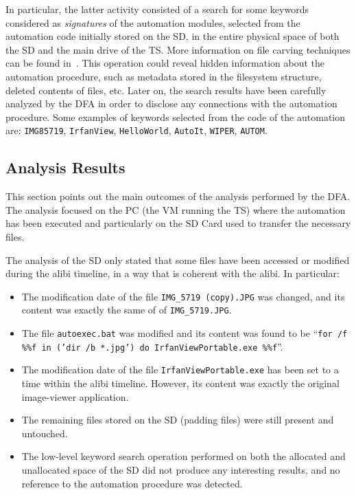 \documentclass[10pt, conference]{IEEEtran}
\begin{document}
In particular, the latter activity consisted of a search for some keywords considered as {\sl signatures} of the automation modules, selected from the automation code initially stored on the SD, in the entire physical space of both the SD and the main drive of the TS. 
More information on file carving techniques can be found in~\cite{jowua11-2-3-03}.
This operation could reveal hidden information about the automation procedure, such as metadata stored in the filesystem structure, deleted contents of files, etc. Later on, the search results have been carefully analyzed by the DFA in order to disclose any connections with the automation procedure. 
Some examples of keywords selected from the code of the automation are: \verb=IMG85719=, \verb=IrfanView=, \verb=HelloWorld=, \verb=AutoIt=, \verb=WIPER=, \verb=AUTOM=.


\subsection{Analysis Results}

This section points out the main outcomes of the analysis performed by the DFA. The analysis focused on the PC (the VM running the TS)  where the automation has been executed and particularly on the SD Card used to transfer the necessary files. 

 The analysis of the SD only stated that some files have been accessed or modified during the alibi timeline, in a way that is coherent with the alibi. In particular:

\begin{itemize}
 \item The modification date of the file \verb=IMG_5719 (copy).JPG= was changed, and its content was exactly the same of of \verb=IMG_5719.JPG=. 
 \item The file \verb=autoexec.bat= was modified and its content was found to be ``{\tt for /f \%\%f in ('dir /b *.jpg') do IrfanViewPortable.exe \%\%f}''. 
 \item The modification date of the file \verb=IrfanViewPortable.exe= has been set to a time within the alibi timeline. However, its content was exactly the original image-viewer application.
 \item The remaining files stored on the SD (padding files) were still present and untouched.
 \item The low-level keyword search operation performed on both the allocated and unallocated space of the SD did not produce any interesting results, and no reference to the automation procedure was detected.
\end{itemize}
\end{document}
